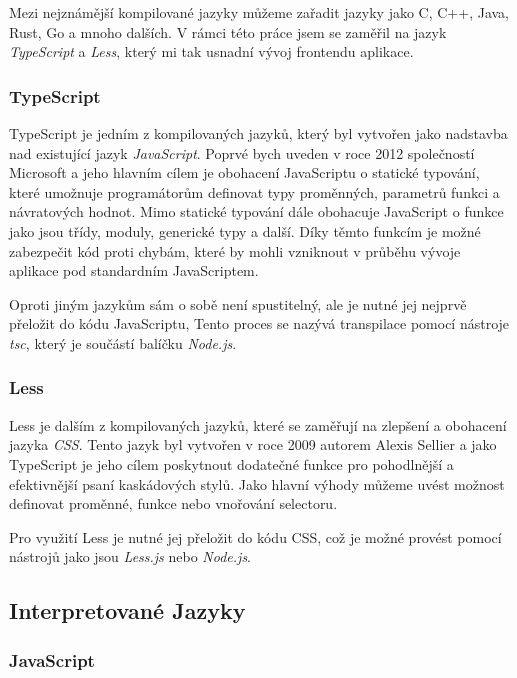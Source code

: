 Mezi nejznámější kompilované jazyky můžeme zařadit jazyky jako C, C++, Java, Rust, Go a mnoho dalších. V rámci této práce jsem se zaměřil na jazyk \textit{TypeScript} a \textit{Less}, který mi tak usnadní vývoj frontendu aplikace.

\subsubsection{TypeScript}
\label{subsubsec:languages-compiled-typescript}
TypeScript je jedním z kompilovaných jazyků, který byl vytvořen jako nadstavba nad existující jazyk \textit{JavaScript}. Poprvé bych uveden v roce 2012 společností Microsoft a jeho hlavním cílem je obohacení JavaScriptu o statické typování, které umožnuje programátorům definovat typy proměnných, parametrů funkci a návratových hodnot. Mimo statické typování dále obohacuje JavaScript o funkce jako jsou třídy, moduly, generické typy a další. Díky těmto funkcím je možné zabezpečit kód proti chybám, které by mohli vzniknout v průběhu vývoje aplikace pod standardním JavaScriptem.

Oproti jiným jazykům sám o sobě není spustitelný, ale je nutné jej nejprvě přeložit do kódu JavaScriptu, Tento proces se nazývá transpilace pomocí nástroje \textit{tsc}, který je součástí balíčku \textit{Node.js}.

\subsubsection{Less}
\label{subsubsec:languages-compiled-less}
Less je dalším z kompilovaných jazyků, které se zaměřují na zlepšení a obohacení jazyka \textit{CSS}. Tento jazyk byl vytvořen v roce 2009 autorem Alexis Sellier a jako TypeScript je jeho cílem poskytnout dodatečné funkce pro pohodlnější a efektivnější psaní kaskádových stylů. Jako hlavní výhody můžeme uvést možnost definovat proměnné, funkce nebo vnořování selectoru.

Pro využití Less je nutné jej přeložit do kódu CSS, což je možné provést pomocí nástrojů jako jsou \textit{Less.js} nebo \textit{Node.js}.

\subsection{Interpretované Jazyky}
\label{subsec:languages-interpreted}

\subsubsection{JavaScript}
\label{subsubsec:languages-interpreted-javascript}

